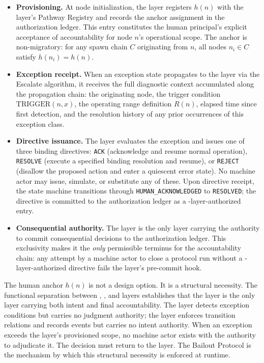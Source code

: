 \begin{itemize}\itemsep=0pt
\item[(\textit{i})] \textbf{Provisioning.} At node initialization, the \purpose{} layer registers $h(n)$ with the \fact{} layer's Pathway Registry and records the anchor assignment in the authorization ledger. This entry constitutes the human principal's explicit acceptance of accountability for node $n$'s operational scope. The anchor is non-migratory: for any spawn chain $C$ originating from $n$, all nodes $n_i\in C$ satisfy $h(n_i)=h(n)$.

\item[(\textit{ii})] \textbf{Exception receipt.} When an exception state propagates to the \purpose{} layer via the Escalate algorithm, it receives the full diagnostic context accumulated along the propagation chain: the originating node, the trigger condition $\mathrm{TRIGGER}(n,x)$, the operating range definition $R(n)$, elapsed time since first detection, and the resolution history of any prior occurrences of this exception class.

\item[(\textit{iii})] \textbf{Directive issuance.} The \purpose{} layer evaluates the exception and issues one of three binding directives: \texttt{ACK} (acknowledge and resume normal operation), \texttt{RESOLVE} (execute a specified binding resolution and resume), or \texttt{REJECT} (disallow the proposed action and enter a quiescent error state). No machine actor may issue, simulate, or substitute any of these. Upon directive receipt, the state machine transitions through \texttt{HUMAN\_ACKNOWLEDGED} to \texttt{RESOLVED}; the directive is committed to the authorization ledger as a \purpose-layer-authorized entry.

\item[(\textit{iv})] \textbf{Consequential authority.} The \purpose{} layer is the only layer carrying the authority to commit consequential decisions to the authorization ledger. This exclusivity makes it the \emph{only} permissible terminus for the accountability chain: any attempt by a machine actor to close a protocol run without a \purpose-layer-authorized directive fails the \fact{} layer's pre-commit hook.
\end{itemize}

The human anchor $h(n)$ is not a design option. It is a structural necessity. The functional separation between \purpose{}, \bounds{}, and \fact{} layers establishes that the \purpose{} layer is the only layer carrying both intent and final accountability. The \bounds{} layer detects exception conditions but carries no judgment authority; the \fact{} layer enforces transition relations and records events but carries no intent authority. When an exception exceeds the \bounds{} layer's provisioned scope, no machine actor exists with the authority to adjudicate it. The decision must return to the \purpose{} layer. The Bailout Protocol is the mechanism by which this structural necessity is enforced at runtime.

